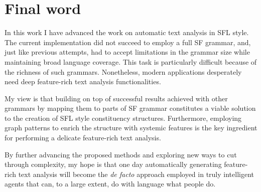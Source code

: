 \section{Final word}

    In this work I have advanced the work on automatic text analysis in SFL style. The current implementation did not succeed to employ a full SF grammar, and, just like previous attempts, had to accept limitations in the grammar size while maintaining broad language coverage. This task is particularly difficult because of the richness of such grammars. Nonetheless, modern applications desperately need deep feature-rich text analysis functionalities. 
    
    My view is that building on top of successful results achieved with other grammars by mapping them to parts of SF grammar constitutes a viable solution to the creation of SFL style constituency structures. Furthermore, employing graph patterns to enrich the structure with systemic features is the key ingredient for performing a delicate feature-rich text analysis.
    
    By further advancing the proposed methods and exploring new ways to cut through complexity, my hope is that one day automatically generating feature-rich text analysis will become the \textit{de facto} approach employed in truly intelligent agents that can, to a large extent, do with language what people do.